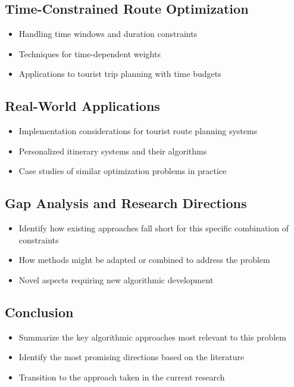 \subsection{Time-Constrained Route Optimization}
\begin{itemize}
    \item Handling time windows and duration constraints
    \item Techniques for time-dependent weights
    \item Applications to tourist trip planning with time budgets
\end{itemize}

\subsection{Real-World Applications}
\begin{itemize}
    \item Implementation considerations for tourist route planning systems
    \item Personalized itinerary systems and their algorithms
    \item Case studies of similar optimization problems in practice
\end{itemize}

\subsection{Gap Analysis and Research Directions}
\begin{itemize}
    \item Identify how existing approaches fall short for this specific combination of constraints
    \item How methods might be adapted or combined to address the problem
    \item Novel aspects requiring new algorithmic development
\end{itemize}

\subsection{Conclusion}
\begin{itemize}
    \item Summarize the key algorithmic approaches most relevant to this problem
    \item Identify the most promising directions based on the literature
    \item Transition to the approach taken in the current research
\end{itemize}